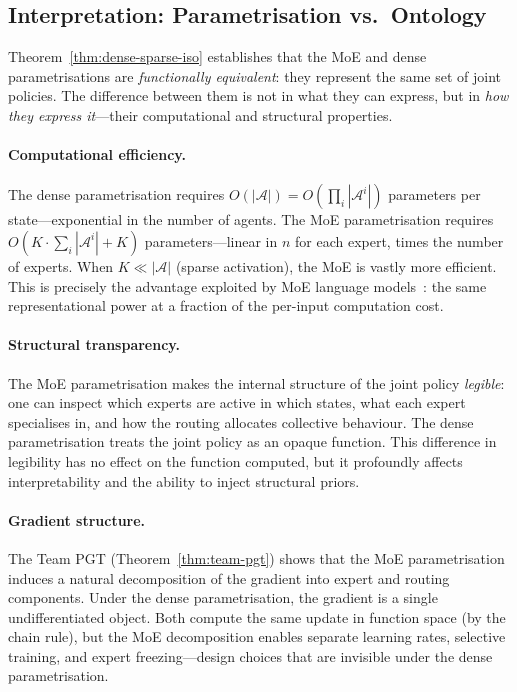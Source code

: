 \subsection{Interpretation: Parametrisation vs.\ Ontology}
\label{subsec:param-vs-ontology}

Theorem~\ref{thm:dense-sparse-iso} establishes that the MoE and dense parametrisations are \emph{functionally equivalent}: they represent the same set of joint policies. The difference between them is not in what they can express, but in \emph{how they express it}---their computational and structural properties.

\paragraph{Computational efficiency.} The dense parametrisation requires $O(|\bm{\mathcal{A}}|)=O(\prod_i|\mathcal{A}^i|)$ parameters per state---exponential in the number of agents. The MoE parametrisation requires $O(K\cdot\sum_i|\mathcal{A}^i|+K)$ parameters---linear in $n$ for each expert, times the number of experts. When $K\ll|\bm{\mathcal{A}}|$ (sparse activation), the MoE is vastly more efficient. This is precisely the advantage exploited by MoE language models~\cite{shazeer2017,deepseekv3}: the same representational power at a fraction of the per-input computation cost.

\paragraph{Structural transparency.} The MoE parametrisation makes the internal structure of the joint policy \emph{legible}: one can inspect which experts are active in which states, what each expert specialises in, and how the routing allocates collective behaviour. The dense parametrisation treats the joint policy as an opaque function. This difference in legibility has no effect on the function computed, but it profoundly affects interpretability and the ability to inject structural priors.

\paragraph{Gradient structure.} The Team PGT (Theorem~\ref{thm:team-pgt}) shows that the MoE parametrisation induces a natural decomposition of the gradient into expert and routing components. Under the dense parametrisation, the gradient is a single undifferentiated object. Both compute the same update in function space (by the chain rule), but the MoE decomposition enables separate learning rates, selective training, and expert freezing---design choices that are invisible under the dense parametrisation.

